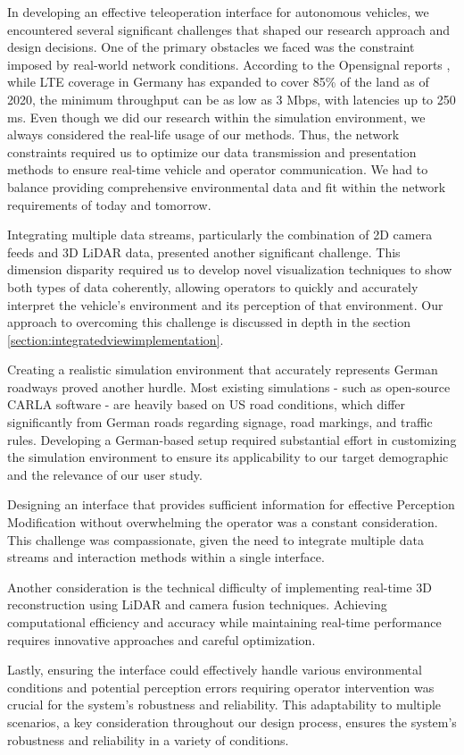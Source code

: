 In developing an effective teleoperation interface for autonomous vehicles, we encountered several significant challenges that shaped our research approach and design decisions.
One of the primary obstacles we faced was the constraint imposed by real-world network conditions.
According to the Opensignal reports \cite{opensignal2020germany}, while LTE coverage in Germany has expanded to cover 85\% of the land as of 2020,
the minimum throughput can be as low as 3 Mbps, with latencies up to 250 ms. Even though we did our research within the simulation environment,
we always considered the real-life usage of our methods. Thus, the network constraints required us to optimize our data transmission and presentation methods to ensure
real-time vehicle and operator communication. We had to balance providing comprehensive environmental data and fit within the network requirements of today and tomorrow.

Integrating multiple data streams, particularly the combination of 2D camera feeds and 3D LiDAR data, presented another significant challenge.
This dimension disparity required us to develop novel visualization techniques to show both types of data coherently, allowing operators
to quickly and accurately interpret the vehicle's environment and its perception of that environment. Our approach to overcoming this challenge is
discussed in depth in the section \ref{section:integratedviewimplementation}.

Creating a realistic simulation environment that accurately represents German roadways proved another hurdle. Most existing simulations - such as open-source CARLA software \cite{Dosovitskiy2017CARLAAO} - are heavily based on US road conditions, which differ significantly from German roads regarding signage, road markings, and traffic rules. Developing a German-based setup required substantial effort in customizing the simulation environment to ensure its applicability to our target demographic and the relevance of our user study.

Designing an interface that provides sufficient information for effective Perception Modification without overwhelming the operator was a constant consideration. This challenge was compassionate, given the need to integrate multiple data streams and interaction methods within a single interface.

Another consideration is the technical difficulty of implementing real-time 3D reconstruction using LiDAR and camera fusion techniques. Achieving computational efficiency and accuracy while maintaining real-time performance requires innovative approaches and careful optimization.

Lastly, ensuring the interface could effectively handle various environmental conditions and potential perception errors requiring operator intervention was crucial for the system's robustness and reliability. This adaptability to multiple scenarios, a key consideration throughout our design process, ensures the system's robustness and reliability in a variety of conditions.
